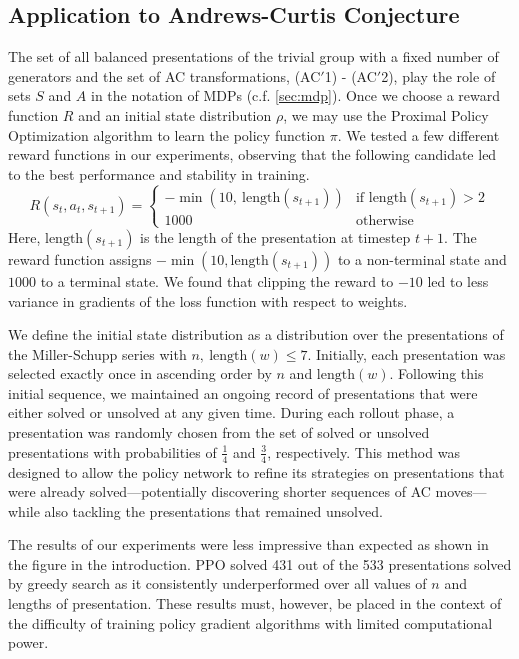 \subsection{Application to Andrews-Curtis Conjecture} \label{sec:application}

The set of all balanced presentations of the trivial group with a fixed number of generators and the set of AC transformations, (AC$'$1) - (AC$'$2), play the role of sets $S$ and $A$ in the notation of MDPs (c.f. \autoref{sec:mdp}). Once we choose a reward function $R$ and an initial state distribution $\rho$, we may use the Proximal Policy Optimization algorithm to learn the policy function $\pi$. We tested a few different reward functions in our experiments, observing that the following candidate led to the best performance and stability in training.
\[
R(s_{t}, a_{t}, s_{t+1}) = 
\begin{cases} 
-\min(10, \ \text{length}(s_{t+1})) & \text{if length}(s_{t+1}) > 2 \\
1000 & \text{otherwise } 
\end{cases}
\]
Here, $\text{length}(s_{t+1})$ is the length of the presentation at timestep $t+1$. The reward function assigns $-\min(10, \text{length}(s_{t+1}))$ to a non-terminal state and $1000$ to a terminal state. We found that clipping the reward to $-10$ led to less variance in gradients of the loss function with respect to weights.
\newline

We define the initial state distribution as a distribution over the presentations of the Miller-Schupp series with $n, \ \text{length}(w) \leq 7$. Initially, each presentation was selected exactly once in ascending order by $n$ and $\text{length}(w)$. Following this initial sequence, we maintained an ongoing record of presentations that were either solved or unsolved at any given time. During each rollout phase, a presentation was randomly chosen from the set of solved or unsolved presentations with probabilities of  $\frac{1}{4}$ and $\frac{3}{4}$, respectively. This method was designed to allow the policy network to refine its strategies on presentations that were already solved—potentially discovering shorter sequences of AC moves—while also tackling the presentations that remained unsolved.
\newline

The results of our experiments were less impressive than expected as shown in the figure in the introduction. PPO solved 431 out of the 533 presentations solved by greedy search as it consistently underperformed over all values of $n$ and lengths of presentation. These results must, however, be placed in the context of the difficulty of training policy gradient algorithms with limited computational power.

